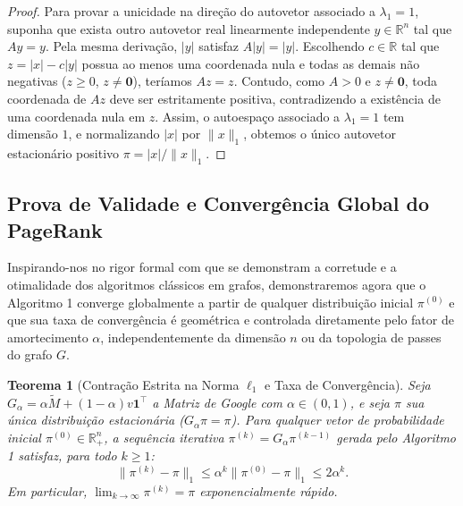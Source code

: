 \documentclass[10pt,a4paper]{article}
\theoremstyle{definition}
\theoremstyle{plain}
\newtheorem{teorema}[definicao]{Teorema}
\theoremstyle{remark}
\begin{document}
\begin{proof}
Para provar a unicidade na direção do autovetor associado a $\lambda_1 = 1$, suponha que exista outro autovetor real linearmente independente $y \in \mathbb{R}^n$ tal que $A y = y$. Pela mesma derivação, $|y|$ satisfaz $A|y| = |y|$. Escolhendo $c \in \mathbb{R}$ tal que $z = |x| - c|y|$ possua ao menos uma coordenada nula e todas as demais não negativas ($z \ge 0$, $z \neq \mathbf{0}$), teríamos $Az = z$. Contudo, como $A > 0$ e $z \neq \mathbf{0}$, toda coordenada de $Az$ deve ser estritamente positiva, contradizendo a existência de uma coordenada nula em $z$. Assim, o autoespaço associado a $\lambda_1 = 1$ tem dimensão $1$, e normalizando $|x|$ por $\|x\|_1$, obtemos o único autovetor estacionário positivo $\pi = |x|/\|x\|_1$.
\end{proof}

\subsection{\sffamily Prova de Validade e Convergência Global do PageRank}

Inspirando-nos no rigor formal com que se demonstram a corretude e a otimalidade dos algoritmos clássicos em grafos, demonstraremos agora que o Algoritmo 1 converge globalmente a partir de qualquer distribuição inicial $\pi^{(0)}$ e que sua taxa de convergência é geométrica e controlada diretamente pelo fator de amortecimento $\alpha$, independentemente da dimensão $n$ ou da topologia de passes do grafo $G$.

\begin{teorema}[Contração Estrita na Norma $\ell_1$ e Taxa de Convergência]
\label{teo:convergencia_pagerank}
Seja $G_{\alpha} = \alpha \widetilde{M} + (1 - \alpha) v \mathbf{1}^{\top}$ a Matriz de Google com $\alpha \in (0, 1)$, e seja $\pi$ sua única distribuição estacionária ($G_{\alpha}\pi = \pi$). Para qualquer vetor de probabilidade inicial $\pi^{(0)} \in \mathbb{R}^n_{+}$, a sequência iterativa $\pi^{(k)} = G_{\alpha}\pi^{(k-1)}$ gerada pelo Algoritmo 1 satisfaz, para todo $k \ge 1$:
\begin{equation}
\|\pi^{(k)} - \pi\|_1 \le \alpha^k \|\pi^{(0)} - \pi\|_1 \le 2 \alpha^k.
\label{eq:cota_convergencia}
\end{equation}
Em particular, $\lim_{k \to \infty} \pi^{(k)} = \pi$ exponencialmente rápido.
\end{teorema}
\end{document}
